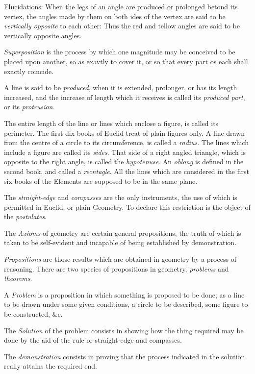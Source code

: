 \documentclass{article}
\begin{document}
Elucidations: 
When the legs of an angle are produced or prolonged betond its vertex, the angles made by them on both ides of the vertex are said to be \textit{vertically opposite} to each other: Thus the red and tellow angles are said to be vertically opposite angles. 

\textit{Superposition} is the process by which one magnitude may be conceived to be placed upon another, so as exavtly to cover it, or so that every part os each shall exactly coincide. 

A line is said to be \textit{produced}, when it is extended, prolonger, or has its length increased, and the increase of length which it receives is called its \textit{produced part}, or its \textit{protrusion}. 

The entire length of the line or lines which enclose a figure, is called its perimeter. The first dix books of Euclid treat of plain figures only. A line drawn from the centre of a circle to its circumference, is called a \textit{radius}. The lines which include a figure are called its \textit{sides}. That side of a right angled triangle, which is opposite to the right angle, is called the \textit{hypotenuse}. An \textit{oblong} is defined in the second book, and called a \textit{recntagle}. All the lines which are considered in the first six books of the Elements are supposed to be in the same plane. 

The \textit{straight-edge} and \textit{compasses} are the only instruments, the use of which is permitted in Euclid, or plain Geometry. To declare this restriction is the object of the \textit{postulates}. 

The \textit{Axioms} of geometry are certain general propositions, the truth of which is taken to be self-evident and incapable of being established by demonstration. 

\textit{Propositions} are those results which are obtained in geometry by a process of reasoning. There are two species of propositions in geometry, \textit{problems} and \textit{theorems}. 

A \textit{Problem} is a proposition in which something is proposed to be done; as a line to be drawn under some given conditions, a circle to be described, some figure to be constructed, \&c. 

The \textit{Solution} of the problem consists in showing how the thing required may be done by the aid of the rule or straight-edge and compasses. 

The \textit{demonstration} consists in proving that the process indicated in the solution really attains the required end. 
\end{document}
